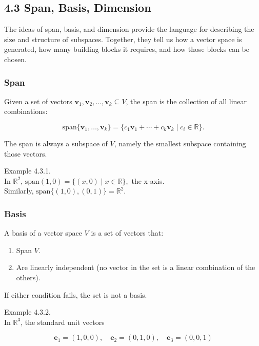 \documentclass[
  12pt,
  a4paper,
]{article}
\begin{document}
\subsection{4.3 Span, Basis, Dimension}\label{43-span-basis-dimension}

The ideas of span, basis, and dimension provide the language for
describing the size and structure of subspaces. Together, they tell us
how a vector space is generated, how many building blocks it requires,
and how those blocks can be chosen.

\subsubsection{Span}\label{span}

Given a set of vectors
\({\mathbf{v}_1, \mathbf{v}_2, \dots, \mathbf{v}_k} \subseteq V\), the
span is the collection of all linear combinations:

\[\text{span}\{\mathbf{v}_1, \dots, \mathbf{v}_k\} = \{ c_1\mathbf{v}_1 + \cdots + c_k\mathbf{v}_k \mid c_i \in \mathbb{R} \}.\]

The span is always a subspace of \(V\), namely the smallest subspace
containing those vectors.

Example 4.3.1.\\
In \(\mathbb{R}^2\),
\( \text{span}{(1,0)} = \{(x,0) \mid x \in \mathbb{R}\},\) the x-axis.\\
Similarly, \(\text{span}\{(1,0),(0,1)\} = \mathbb{R}^2.\)

\subsubsection{Basis}\label{basis}

A basis of a vector space \(V\) is a set of vectors that:

\begin{enumerate}
\def\labelenumi{\arabic{enumi}.}
\item
  Span \(V\).
\item
  Are linearly independent (no vector in the set is a linear combination
  of the others).
\end{enumerate}

If either condition fails, the set is not a basis.

Example 4.3.2.\\
In \(\mathbb{R}^3\), the standard unit vectors

\[\mathbf{e}_1 = (1,0,0), \quad \mathbf{e}_2 = (0,1,0), \quad \mathbf{e}_3 = (0,0,1)\]
\end{document}
